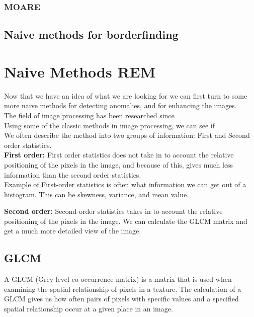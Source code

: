     \subsubsection{MOARE}
   \subsection{Naive methods for borderfinding}

%
%
\section{Naive Methods REM}
      Now that we have an idea of what we are looking for we can first turn to some more naive methods for detecting anomalies, and for enhancing the images.\\
      The field of image processing has been researched since\\ %
      
      Using some of the classic methods in image processing, we can see if\\ %
      
      We often describe the method into two groups of information: First and Second order statistics.\\
      \textbf{First order:} First order statistics does not take in to account the relative positioning of the pixels in the image, and because of this, gives much less information than the second order statistics.\\
      Example of First-order statistics is often what information we can get out of a histogram. This can be skewness, variance, and mean value.\\
      
      \vspace{10px}
      
      \textbf{Second order:} Second-order statistics takes in to account the relative positioning of the pixels in the image. We can calculate the GLCM matrix and get a much more detailed view of the image. \\
      
      
      
      \subsection{GLCM}
        A GLCM (Grey-level co-occurrence matrix) is a matrix that is used when examining the spatial relationship of pixels in a texture. 
        The calculation of a GLCM gives us how often pairs of pixels with specific values and a specified spatial relationship occur at a given place in an image. %
      
